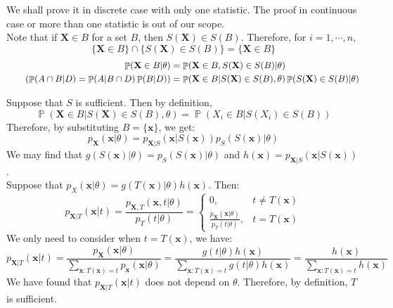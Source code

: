 \documentclass{huhtakm-template-book-v2}
\DeclareMathOperator{\prob}{\mathbb{P}}
\begin{document}
\begin{proofing}
	We shall prove it in discrete case with only one statistic. The proof in continuous case or more than one statistic is out of our scope.\\
	Note that if $\mathbf{X}\in B$ for a set $B$, then $S(\mathbf{X})\in S(B)$. Therefore, for $i=1,\cdots,n$,
	\begin{equation*}
		\{\mathbf{X}\in B\}\cap\{S(\mathbf{X})\in S(B)\}=\{\mathbf{X}\in B\}
	\end{equation*}
	\begin{align*}
		\prob(\mathbf{X}\in B|\theta)&=\prob(\mathbf{X}\in B,S(\mathbf{X})\in S(B)|\theta)\\
		\tag{$\prob(A\cap B|D)=\prob(A|B\cap D)\prob(B|D)$}
		&=\prob(\mathbf{X}\in B|S(\mathbf{X})\in S(B),\theta)\prob(S(\mathbf{X})\in S(B)|\theta)
	\end{align*}
	
	\newpage
	Suppose that $S$ is sufficient. Then by definition,
	\begin{equation*}
		\prob(\mathbf{X}\in B|S(\mathbf{X})\in S(B),\theta)=\prob(X_{i}\in B|S(X_{i})\in S(B))
	\end{equation*}
	Therefore, by substituting $B=\{\mathbf{x}\}$, we get:
	\begin{equation*}
		p_{\mathbf{X}}(\mathbf{x}|\theta)=p_{\mathbf{X}|S}(\mathbf{x}|S(\mathbf{x}))p_{S}(S(\mathbf{x})|\theta)
	\end{equation*}
	We may find that $g(S(\mathbf{x})|\theta)=p_{S}(S(\mathbf{x})|\theta)$ and $h(\mathbf{x})=p_{\mathbf{X}|S}(\mathbf{x}|S(\mathbf{x}))$.\\
	Suppose that $p_{X}(\mathbf{x}|\theta)=g(T(\mathbf{x})|\theta)h(\mathbf{x})$. Then:
	\begin{equation*}
		p_{\mathbf{X}|T}(\mathbf{x}|t)=\frac{p_{\mathbf{X},T}(\mathbf{x},t|\theta)}{p_{T}(t|\theta)}=\begin{cases}
			0, &t\neq T(\mathbf{x})\\
			\frac{p_{\mathbf{X}}(\mathbf{x}|\theta)}{p_{T}(t|\theta)}, &t=T(\mathbf{x})
		\end{cases}
	\end{equation*}
	 We only need to consider when $t=T(\mathbf{x})$, we have:
	\begin{equation*}
		p_{\mathbf{X}|T}(\mathbf{x}|t)=\frac{p_{\mathbf{X}}(\mathbf{x}|\theta)}{\sum_{\mathbf{x}:T(\mathbf{x})=t}p_{\mathbf{x}}(\mathbf{x}|\theta)}=\frac{g(t|\theta)h(\mathbf{x})}{\sum_{\mathbf{x}:T(\mathbf{x})=t}g(t|\theta)h(\mathbf{x})}=\frac{h(\mathbf{x})}{\sum_{\mathbf{x}:T(\mathbf{x})=t}h(\mathbf{x})}
	\end{equation*}
	We have found that $p_{\mathbf{X}|T}(\mathbf{x}|t)$ does not depend on $\theta$. Therefore, by definition, $T$ is sufficient.
\end{proofing}
\end{document}
